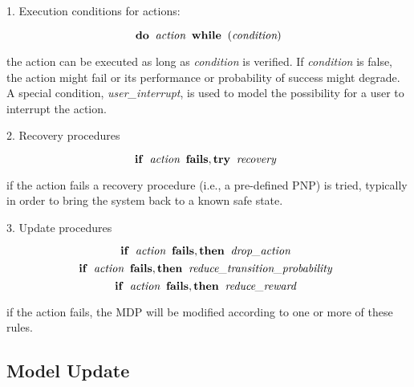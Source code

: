1. Execution conditions for actions:

\[ \mathbf{do} \;\; \emph{action} \;\; \mathbf{while} \;\; ( \emph{condition} ) \]

\noindent
the action can be executed as long as \emph{condition} is verified.
If \emph{condition} is false, the action might fail or its performance or probability of success might degrade.
A special condition, \emph{user\_interrupt}, is used to model the possibility for a user to interrupt the action.

\vspace{0.5cm}

2. Recovery procedures

\[ \mathbf{if} \;\; \emph{action} \;\; \mathbf{fails, try} \;\; \emph{recovery} \;\; \]

\noindent
if the action fails a recovery procedure (i.e., a pre-defined PNP) is tried, typically in order to bring the system back to a known safe state.


\vspace{0.5cm}

3. Update procedures

\[ \mathbf{if} \;\; \emph{action} \;\; \mathbf{fails, then} \;\; \emph{drop\_action} \;\; \]
\[ \mathbf{if} \;\; \emph{action} \;\; \mathbf{fails, then} \;\; \emph{reduce\_transition\_probability} \;\; \]
\[ \mathbf{if} \;\; \emph{action} \;\; \mathbf{fails, then} \;\; \emph{reduce\_reward} \;\; \]



\noindent
if the action fails, the MDP will be modified according to one or more of these rules.






\subsection{Model Update}







